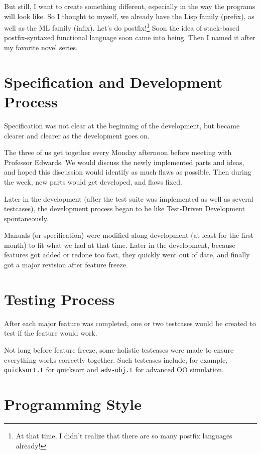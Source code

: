 \documentclass{report}
\begin{document}
But still, I want to create something different, especially in the way the programs will look like. So I thought to myself, we already have the Lisp family (prefix), as well as the ML family (infix). Let's do postfix!\footnote{At that time, I didn't realize that there are so many postfix languages already!} Soon the idea of stack-based postfix-syntaxed functional language soon came into being. Then I named it after my favorite novel series.

\section{Specification and Development Process}

Specification was not clear at the beginning of the development, but became clearer and clearer as the development goes on.

The three of us get together every Monday afternoon before meeting with Professor Edwards. We would discuss the newly implemented parts and ideas, and hoped this discussion would identify as much flaws as possible. Then during the week, new parts would get developed, and flaws fixed.

Later in the development (after the test suite was implemented as well as several testcases), the development process began to be like Test-Driven Development spontaneously.

Manuals (or specification) were modified along development (at least for the first month) to fit what we had at that time. Later in the development, because features got added or redone too fast, they quickly went out of date, and finally got a major revision after feature freeze.

\section{Testing Process}

After each major feature was completed, one or two testcases would be created to test if the feature would work.

Not long before feature freeze, some holistic testcases were made to ensure everything works correctly together. Such testcases include, for example, \texttt{quicksort.t} for quicksort and \texttt{adv-obj.t} for advanced OO simulation.

\section{Programming Style}
\end{document}
